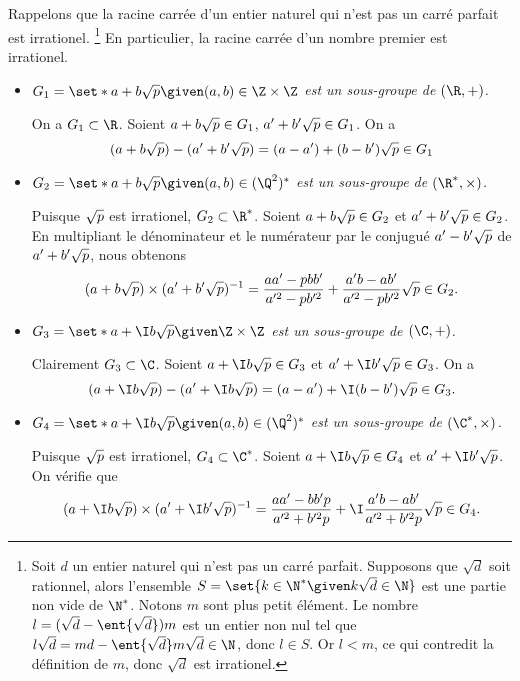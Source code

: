 Rappelons que la racine carrée d'un entier naturel qui n'est pas un carré parfait est 
irrationel.
\footnote{
  Soit $d$ un entier naturel qui n'est pas un carré parfait.
  Supposons que $\sqrt{d}$ soit rationnel, alors l'ensemble $S = \set{k\in\N^* \given k\sqrt{d}\in\N}$ est une partie non vide de $\N^*$.
  Notons $m$ sont plus petit élément. 
  Le nombre $l = (\sqrt{d} - \ent{\sqrt{d}})m$ est un entier non nul tel que $l\sqrt{d} = md - \ent{\sqrt{d}}m\sqrt{d}\in\N$, donc $l\in S$. 
  Or $l < m$, ce qui contredit la définition de $m$, donc $\sqrt{d}$ est irrationel.
}
En particulier, la racine carrée d'un nombre premier est irrationel.

\begin{itemize}
  \item 
    \emph{$G_1 = \set*{a + b\sqrt{\smash[b]{p}} \given (a,b)\in\Z\times\Z}$ est un sous-groupe de $(\R,+)$.}

    On a $G_1\subset \R$.
    Soient $a + b\sqrt{\smash[b]{p}}\in G_1$, $a' + b'\sqrt{\smash[b]{p}}\in G_1$. On a
    \[
      (a + b\sqrt{\smash[b]{p}}) - (a' + b'\sqrt{\smash[b]{p}}) 
        = (a - a') + (b - b')\sqrt{\smash[b]{p}} 
        \in G_1
    \]

  \item
    \emph{$G_2 = \set*{a + b\sqrt{\smash[b]{p}} \given (a,b)\in(\Q^2)^*}$ est un sous-groupe de $(\R^*,\times)$.}

    Puisque $\sqrt{\smash[b]{p}}$ est irrationel, $G_2\subset\R^*$.
    Soient $a + b\sqrt{\smash[b]{p}}\in G_2$ et $a' + b'\sqrt{\smash[b]{p}}\in G_2$. 
    En multipliant le dénominateur et le numérateur par le conjugué $a' - b'\sqrt{\smash[b]{p}}$ de $a' + b'\sqrt{\smash[b]{p}}$, nous obtenons
    \[
      (a + b\sqrt{\smash[b]{p}})\times (a' + b'\sqrt{\smash[b]{p}})^{-1}
        = \frac{aa' - pbb'}{a'^2 - pb'^2}
          +\frac{a'b - ab'}{a'^2 - pb'^2}\sqrt{\smash[b]{p}}
        \in G_2.
    \]

  \item
    \emph{$G_3 = \set*{a + \I b\sqrt{\smash[b]{p}} \given \Z\times\Z}$ est un sous-groupe de $(\C,+)$.}

    Clairement $G_3\subset \C$. 
    Soient $a + \I b\sqrt{\smash[b]{p}}\in G_3$ et $a' + \I b'\sqrt{\smash[b]{p}}\in G_3$. On a
    \[
      (a + \I b\sqrt{\smash[b]{p}}) - (a' + \I b\sqrt{\smash[b]{p}})
        = (a - a') + \I (b - b') \sqrt{\smash[b]{p}} 
        \in G_3.
    \]

  \item
    \emph{$G_4 = \set*{a + \I b\sqrt{\smash[b]{p}} \given (a,b)\in(\Q^2)^*}$ est un sous-groupe de $(\C^*,\times)$.}

    Puisque $\sqrt{\smash[b]{p}}$ est irrationel, $G_4\subset\C^*$.
    Soient $a + \I b\sqrt{\smash[b]{p}}\in G_4$ et $a' + \I b'\sqrt{\smash[b]{p}}$.
    On vérifie que
    \[
      (a + \I b\sqrt{\smash[b]{p}})\times (a' + \I b'\sqrt{\smash[b]{p}})^{-1}
        = \frac{aa' - bb'p}{a'^2 + b'^2p} 
          + \I \frac{a'b - ab'}{a'^2 + b'^2p} \sqrt{\smash[b]{p}}
        \in G_4.
    \]
\end{itemize}
